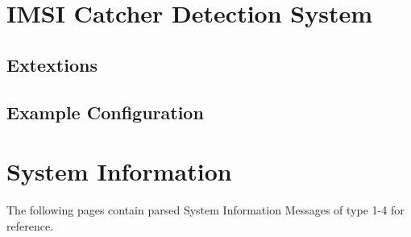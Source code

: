 \chapter{IMSI Catcher Detection System}
\section{Extextions}
\label{sec:extensions}
\section{Example Configuration}
\label{sec:example_config}
\chapter{System Information}
\label{sec:system_infos}
The following pages contain parsed System Information Messages of type 1-4  for reference.

